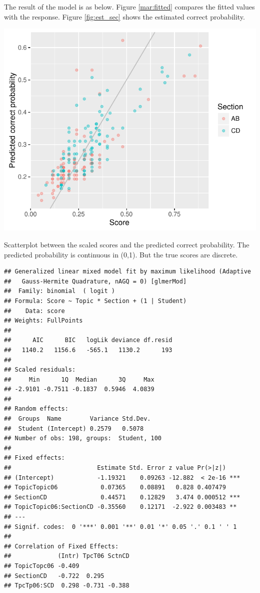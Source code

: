 \documentclass[12pt,nohyper]{tufte-handout}\usepackage[]{graphicx}\usepackage[]{color}
\makeatletter
\newenvironment{kframe}{%
 \def\at@end@of@kframe{}%
 \ifinner\ifhmode%
  \def\at@end@of@kframe{\end{minipage}}%
  \begin{minipage}{\columnwidth}%
 \fi\fi%
 \def\FrameCommand##1{\hskip\@totalleftmargin \hskip-\fboxsep
 \colorbox{shadecolor}{##1}\hskip-\fboxsep
     \hskip-\linewidth \hskip-\@totalleftmargin \hskip\columnwidth}%
 \MakeFramed {\advance\hsize-\width
   \@totalleftmargin\z@ \linewidth\hsize
   \@setminipage}}%
 {\par\unskip\endMakeFramed%
 \at@end@of@kframe}
\newenvironment{knitrout}{}{} %
\makeatother
\begin{document}
The result of the model is as below. Figure \ref{mar:fitted} compares 
the fitted values with the response. Figure \ref{fig:est_sec} 
shows the estimated correct probability.
\begin{marginfigure}\includegraphics[width=0.95\linewidth]{Stat101_allSections_fitted}
\caption{\label{mar:fitted}Scatterplot between the scaled scores and the 
predicted correct probability. The predicted probability is continuous in (0,1).
But the true scores are discrete.}
\end{marginfigure}
\clearpage
\begin{knitrout}
\color{fgcolor}\begin{kframe}
\begin{verbatim}
## Generalized linear mixed model fit by maximum likelihood (Adaptive
##   Gauss-Hermite Quadrature, nAGQ = 0) [glmerMod]
##  Family: binomial  ( logit )
## Formula: Score ~ Topic * Section + (1 | Student)
##    Data: score
## Weights: FullPoints
## 
##      AIC      BIC   logLik deviance df.resid 
##   1140.2   1156.6   -565.1   1130.2      193 
## 
## Scaled residuals: 
##     Min      1Q  Median      3Q     Max 
## -2.9101 -0.7511 -0.1837  0.5946  4.0839 
## 
## Random effects:
##  Groups  Name        Variance Std.Dev.
##  Student (Intercept) 0.2579   0.5078  
## Number of obs: 198, groups:  Student, 100
## 
## Fixed effects:
##                        Estimate Std. Error z value Pr(>|z|)    
## (Intercept)            -1.19321    0.09263 -12.882  < 2e-16 ***
## TopicTopic06            0.07365    0.08891   0.828 0.407479    
## SectionCD               0.44571    0.12829   3.474 0.000512 ***
## TopicTopic06:SectionCD -0.35560    0.12171  -2.922 0.003483 ** 
## ---
## Signif. codes:  0 '***' 0.001 '**' 0.01 '*' 0.05 '.' 0.1 ' ' 1
## 
## Correlation of Fixed Effects:
##             (Intr) TpcT06 SctnCD
## TopicTopc06 -0.409              
## SectionCD   -0.722  0.295       
## TpcTp06:SCD  0.298 -0.731 -0.388
\end{verbatim}
\end{kframe}
\end{knitrout}
\end{document}
